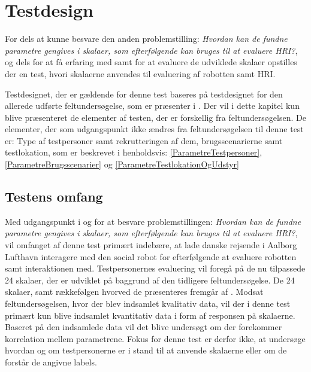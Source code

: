 \chapter{Testdesign}
\label{TestAfSkalaTestdesign}
%
For dels at kunne besvare den anden problemstilling: \textit{Hvordan kan de fundne parametre gengives i skalaer, som efterfølgende kan bruges til at evaluere HRI?}, og dels for at få erfaring med samt for at evaluere de udviklede skalaer opstilles der en test, hvori skalaerne anvendes til evaluering af robotten samt HRI. 

Testdesignet, der er gældende for denne test baseres på testdesignet for den allerede udførte feltundersøgelse, som er præsenter i . Der vil i dette kapitel kun blive præsenteret de elementer af testen, der er forskellig fra feltundersøgelsen. De elementer, der som udgangspunkt ikke ændres fra feltundersøgelsen til denne test er: Type af testpersoner samt rekrutteringen af dem, brugsscenarierne samt testlokation, som er beskrevet i henholdsvis: \autoref{ParametreTestpersoner}, \autoref{ParametreBrugsscenarier} og \autoref{ParametreTestlokationOgUdstyr} 
%
\section{Testens omfang}
\label{TestAfSkalaTestensOmfang}
%
Med udgangspunkt i og for at besvare problemstillingen: \textit{Hvordan kan de fundne parametre gengives i skalaer, som efterfølgende kan bruges til at evaluere HRI?}, vil omfanget af denne test primært indebære, at lade danske rejsende i Aalborg Lufthavn interagere med den social robot for efterfølgende at evaluere robotten samt interaktionen med. Testpersonernes evaluering vil foregå på de nu tilpassede 24 skalaer, der er udviklet på baggrund af den tidligere feltundersøgelse. De 24 skalaer, samt rækkefølgen hvorved de præsenteres fremgår af . Modsat feltundersøgelsen, hvor der blev indsamlet kvalitativ data, vil der i denne test primært kun blive indsamlet kvantitativ data i form af responsen på skalaerne. Baseret på den indsamlede data vil det blive undersøgt om der forekommer korrelation mellem parametrene. Fokus for denne test er derfor ikke, at undersøge hvordan og om testpersonerne er i stand til at anvende skalaerne eller om de forstår de angivne labels.
\newpage